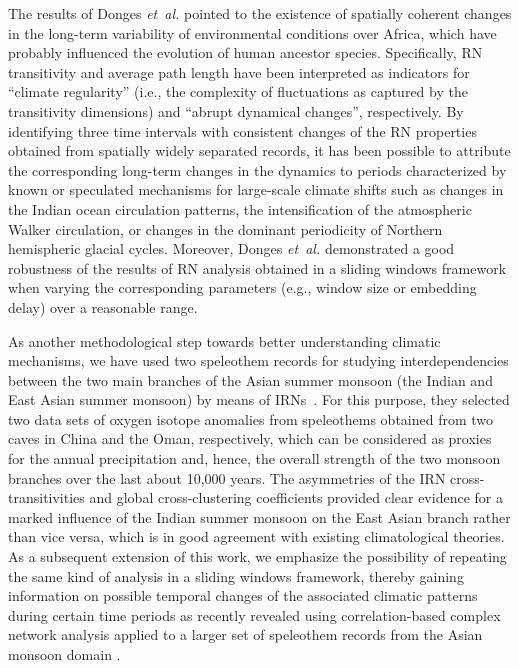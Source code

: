 The results of Donges \textit{et~al.} \cite{Donges2011PNAS} pointed to the existence of spatially coherent changes in the long-term variability of environmental conditions over Africa, which have probably influenced the evolution of human ancestor species. Specifically, RN transitivity and average path length have been interpreted as indicators for ``climate regularity'' (i.e., the complexity of fluctuations as captured by the transitivity dimensions) and ``abrupt dynamical changes'', respectively. By identifying three time intervals with consistent changes of the RN properties obtained from spatially widely separated records, it has been possible to attribute the corresponding long-term changes in the dynamics to periods characterized by known or speculated mechanisms for large-scale climate shifts such as changes in the Indian ocean circulation patterns, the intensification of the atmospheric Walker circulation, or changes in the dominant periodicity of Northern hemispheric glacial cycles. Moreover, Donges \textit{et~al.} \cite{Donges2011NPG} demonstrated a good robustness of the results of RN analysis obtained in a sliding windows framework when varying the corresponding parameters (e.g., window size or embedding delay) over a reasonable range.

As another methodological step towards better understanding climatic mechanisms, we have used two speleothem records for studying interdependencies between the two main branches of the Asian summer monsoon (the Indian and East Asian summer monsoon) by means of IRNs~\cite{Feldhoff2012}. For this purpose, they selected two data sets of oxygen isotope anomalies from speleothems obtained from two caves in China and the Oman, respectively, which can be considered as proxies for the annual precipitation and, hence, the overall strength of the two monsoon branches over the last about 10,000 years. The asymmetries of the IRN cross-transitivities and global cross-clustering coefficients provided clear evidence for a marked influence of the Indian summer monsoon on the East Asian branch rather than vice versa, which is in good agreement with existing climatological theories. As a subsequent extension of this work, we emphasize the possibility of repeating the same kind of analysis in a sliding windows framework, thereby gaining information on possible temporal changes of the associated climatic patterns during certain time periods as recently revealed using correlation-based complex network analysis applied to a larger set of speleothem records from the Asian monsoon domain \cite{Rehfeld2012}.

